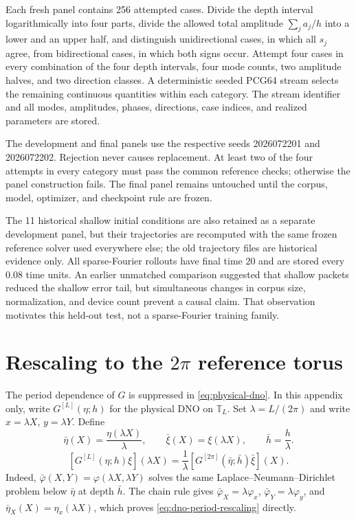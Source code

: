 \documentclass[11pt]{article}
\newcommand{\T}{\mathbb T}
\begin{document}
Each fresh panel contains 256 attempted cases.  Divide the depth interval
logarithmically into four parts, divide the allowed total amplitude
\(\sum_j a_j/h\) into a lower and an upper half, and distinguish
unidirectional cases, in which all \(s_j\) agree, from bidirectional cases,
in which both signs occur.  Attempt four cases in every combination of the
four depth intervals, four mode counts, two amplitude halves, and two
direction classes.  A deterministic seeded PCG64 stream selects the remaining
continuous quantities within each category.  The stream identifier and all modes,
amplitudes, phases, directions, case indices, and realized parameters are
stored.

The development and final panels use the respective seeds 2026072201 and
2026072202.  Rejection never causes replacement.  At least two of the four
attempts in every category must pass the common reference checks; otherwise the
panel construction fails.  The final panel remains untouched until the
corpus, model, optimizer, and checkpoint rule are frozen.

The 11 historical shallow initial conditions are also retained as a separate
development panel, but their trajectories are recomputed with the same frozen
reference solver used everywhere else; the old trajectory files are
historical evidence only.  All sparse-Fourier rollouts have final time 20 and
are stored every 0.08 time units.  An earlier unmatched comparison suggested
that shallow packets reduced the shallow error tail, but simultaneous changes
in corpus size, normalization, and device count prevent a causal claim.  That
observation motivates this held-out test, not a sparse-Fourier training
family.
\section{Rescaling to the \texorpdfstring{$2\pi$}{2pi} reference torus}
\label{app:dno-rescaling}

The period dependence of $G$ is suppressed in
\eqref{eq:physical-dno}.  In this appendix only, write
$G^{[L]}(\eta;h)$ for the physical DNO on $\T_L$.  Set
$\lambda=L/(2\pi)$ and write $x=\lambda X$, $y=\lambda Y$.  Define
\begin{equation}
  \bar\eta(X)=\frac{\eta(\lambda X)}{\lambda},
  \qquad
  \bar\xi(X)=\xi(\lambda X),
  \qquad
  \bar h=\frac{h}{\lambda}.
  \label{eq:rescaled-dno-data}
\end{equation}
\begin{equation}
  \boxed{
  [G^{[L]}(\eta;h)\xi](\lambda X)
  =\frac1\lambda
   [G^{[2\pi]}(\bar\eta;\bar h)\bar\xi](X).
  }
  \label{eq:dno-period-rescaling}
\end{equation}
Indeed, $\bar\varphi(X,Y)=\varphi(\lambda X,\lambda Y)$ solves the same
Laplace--Neumann--Dirichlet problem below $\bar\eta$ at depth $\bar h$.
The chain rule gives $\bar\varphi_X=\lambda\varphi_x$,
$\bar\varphi_Y=\lambda\varphi_y$, and
$\bar\eta_X(X)=\eta_x(\lambda X)$, which proves
\eqref{eq:dno-period-rescaling} directly.
\end{document}
